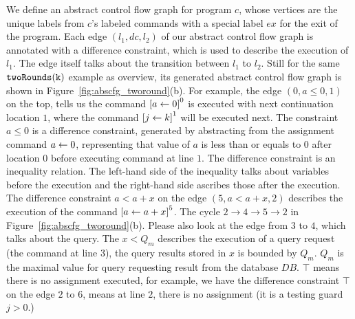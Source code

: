 We define an abstract control flow graph for program $c$, 
whose vertices are the unique labels from $c$'s labeled commands with
a special label $ex$ for the exit of the program. Each edge $(l_1, dc , l_2)$ of our abstract control flow graph is annotated with a difference constraint, which is used to describe the execution of $l_1$. The edge itself talks about the  transition between $l_1$ to $l_2$. Still for the same $\mathtt{twoRounds(k)}$ example as overview, its generated abstract control flow graph is shown in Figure~\ref{fig:abscfg_tworound}(b).
For example, the edge $(0, a \leq 0, 1)$ on the top, tells us the command 
$\clabel{\assign{a}{0}}^0$ is executed with next continuation location $1$,
where the 
command $\clabel{\assign{j}{k}}^1$ will be executed next.
The constraint $a \leq 0$ is a difference constraint, generated by abstracting from the assignment command $\mathrel{ a \leftarrow 0 }$,
representing that value of $a$ is less than or equals to $0$ after 
location $0$ before executing command at line $1$. The difference constraint is an inequality relation. The left-hand side of the inequality talks about variables before the execution and the right-hand side ascribes those after the execution. 
The difference constraint $a < a+x $ on the edge $(5, a < a + x, 2)$ describes the execution of the command $\clabel{\assign{a}{a + x}}^5$.
The cycle $2 \to 4 \to 5 \to 2$ in Figure~\ref{fig:abscfg_tworound}(b). 
Please also look at the edge from $3$ to $4$, which talks about the query. The $x < Q_m$ describes the execution of a query request (the command at line 3), the query results stored in $x$ is bounded by $Q_m$.
$Q_m$ is the maximal value for query requesting result from the database $DB$. $\top$ means there is no assignment executed, for example, we have the difference constraint $\top$ on the edge $2$ to $6$, means at line $2$, there is no assignment (it is a testing guard $j>0$.) 
%
